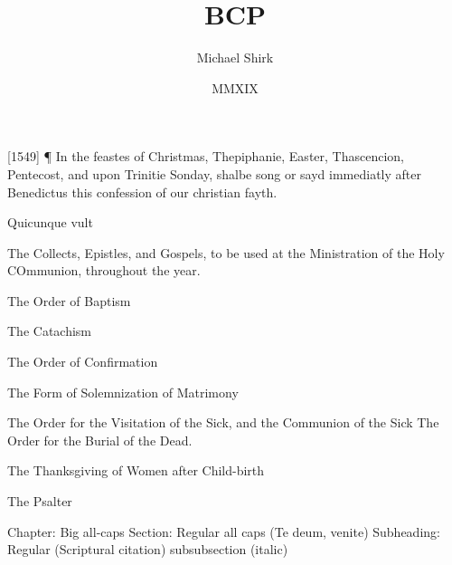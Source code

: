 \documentclass[foolscapvopaper,12pt,twoside,openany,extrafontsizes,final]{memoir}
\begin{document}
\frontmatter
\title{BCP}
\author{Michael Shirk}
\date{MMXIX}



\mainmatter



[1549] ¶ In the feastes of Christmas, Thepiphanie, Easter, Thascencion, Pentecost, and upon Trinitie Sonday, shalbe song or sayd immediatly after Benedictus this confession of our christian fayth.

 
Quicunque vult

The Collects, Epistles, and Gospels, to be used at the Ministration of the Holy COmmunion, throughout the year.



The Order of Baptism

The Catachism

The Order of Confirmation

The Form of Solemnization of Matrimony

The Order for the Visitation of the Sick, and the Communion of the Sick
The Order for the Burial of the Dead.

The Thanksgiving of Women after Child-birth

The Psalter


Chapter: Big all-caps
Section: Regular all caps (Te deum, venite)
Subheading: Regular (Scriptural citation)
subsubsection (italic)
\end{document}
